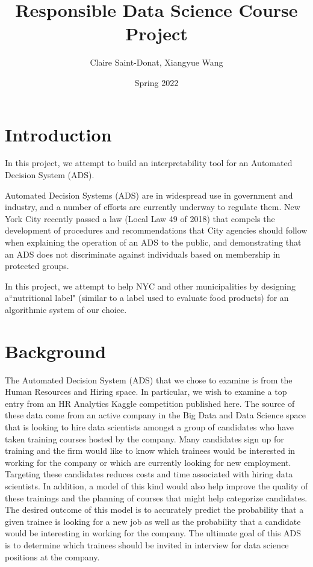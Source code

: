 \documentclass[11pt]{article}
\title{Responsible Data Science Course Project}
\author{Claire Saint-Donat, Xiangyue Wang}
\date{Spring 2022}
\begin{document}
\maketitle
\tableofcontents

\section{Introduction}

In this project, we attempt to build an interpretability tool for an Automated Decision System (ADS). 

Automated Decision Systems (ADS) are in widespread use in government and industry, and a number of efforts are currently underway to regulate them.  New York City recently passed a law (Local Law 49 of 2018) that compels the development of procedures and recommendations that City agencies should follow when explaining the operation of an ADS to the public, and demonstrating that an ADS does not discriminate against individuals based on membership in protected groups.  

In this project, we attempt to help NYC and other municipalities by designing a``nutritional label" (similar to a label used to evaluate food products) for an algorithmic system of our choice. 
\pagebreak

\section{Background}
The Automated Decision System (ADS) that we chose to examine is from the Human Resources and Hiring space.  In particular, we wish to examine a top entry from an HR Analytics Kaggle competition published here.  The source of these data come from an active company in the Big Data and Data Science space that is looking to hire data scientists amongst a group of candidates who have taken training courses hosted by the company.  Many candidates sign up for training and the firm would like to know which trainees would be interested in working for the company or which are currently looking for new employment.  Targeting these candidates reduces costs and time associated with hiring data scientists.  In addition, a model of this kind would also help improve the quality of these trainings and the planning of courses that might help categorize candidates.  The desired outcome of this model is to accurately predict the probability that a given trainee is looking for a new job as well as the probability that a candidate would be interesting in working for the company.  The ultimate goal of this ADS is to determine which trainees should be invited in interview for data science positions at the company.
\end{document}

